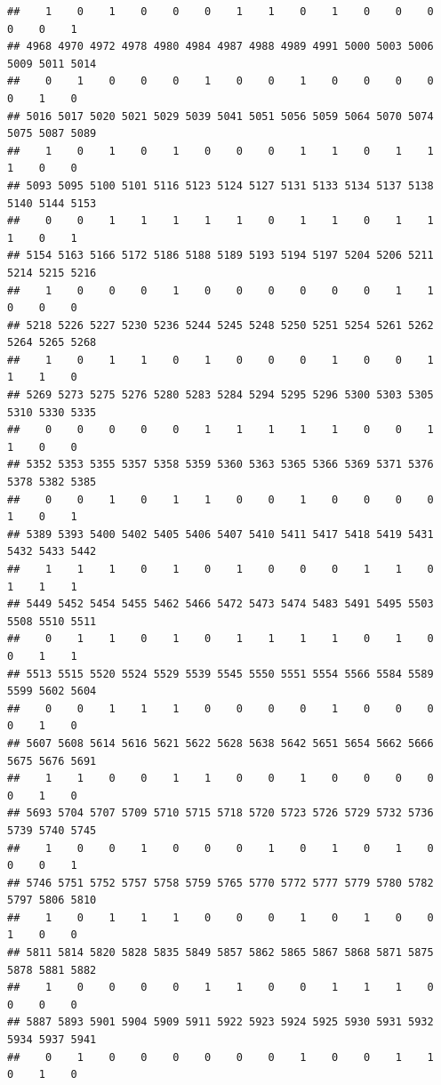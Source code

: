 \documentclass[
]{article}
\begin{document}
\begin{verbatim}
##    1    0    1    0    0    0    1    1    0    1    0    0    0    0    0    1 
## 4968 4970 4972 4978 4980 4984 4987 4988 4989 4991 5000 5003 5006 5009 5011 5014 
##    0    1    0    0    0    1    0    0    1    0    0    0    0    0    1    0 
## 5016 5017 5020 5021 5029 5039 5041 5051 5056 5059 5064 5070 5074 5075 5087 5089 
##    1    0    1    0    1    0    0    0    1    1    0    1    1    1    0    0 
## 5093 5095 5100 5101 5116 5123 5124 5127 5131 5133 5134 5137 5138 5140 5144 5153 
##    0    0    1    1    1    1    1    0    1    1    0    1    1    1    0    1 
## 5154 5163 5166 5172 5186 5188 5189 5193 5194 5197 5204 5206 5211 5214 5215 5216 
##    1    0    0    0    1    0    0    0    0    0    0    1    1    0    0    0 
## 5218 5226 5227 5230 5236 5244 5245 5248 5250 5251 5254 5261 5262 5264 5265 5268 
##    1    0    1    1    0    1    0    0    0    1    0    0    1    1    1    0 
## 5269 5273 5275 5276 5280 5283 5284 5294 5295 5296 5300 5303 5305 5310 5330 5335 
##    0    0    0    0    0    1    1    1    1    1    0    0    1    1    0    0 
## 5352 5353 5355 5357 5358 5359 5360 5363 5365 5366 5369 5371 5376 5378 5382 5385 
##    0    0    1    0    1    1    0    0    1    0    0    0    0    1    0    1 
## 5389 5393 5400 5402 5405 5406 5407 5410 5411 5417 5418 5419 5431 5432 5433 5442 
##    1    1    1    0    1    0    1    0    0    0    1    1    0    1    1    1 
## 5449 5452 5454 5455 5462 5466 5472 5473 5474 5483 5491 5495 5503 5508 5510 5511 
##    0    1    1    0    1    0    1    1    1    1    0    1    0    0    1    1 
## 5513 5515 5520 5524 5529 5539 5545 5550 5551 5554 5566 5584 5589 5599 5602 5604 
##    0    0    1    1    1    0    0    0    0    1    0    0    0    0    1    0 
## 5607 5608 5614 5616 5621 5622 5628 5638 5642 5651 5654 5662 5666 5675 5676 5691 
##    1    1    0    0    1    1    0    0    1    0    0    0    0    0    1    0 
## 5693 5704 5707 5709 5710 5715 5718 5720 5723 5726 5729 5732 5736 5739 5740 5745 
##    1    0    0    1    0    0    0    1    0    1    0    1    0    0    0    1 
## 5746 5751 5752 5757 5758 5759 5765 5770 5772 5777 5779 5780 5782 5797 5806 5810 
##    1    0    1    1    1    0    0    0    1    0    1    0    0    1    0    0 
## 5811 5814 5820 5828 5835 5849 5857 5862 5865 5867 5868 5871 5875 5878 5881 5882 
##    1    0    0    0    0    1    1    0    0    1    1    1    0    0    0    0 
## 5887 5893 5901 5904 5909 5911 5922 5923 5924 5925 5930 5931 5932 5934 5937 5941 
##    0    1    0    0    0    0    0    0    1    0    0    1    1    0    1    0 

\end{verbatim}
\end{document}
